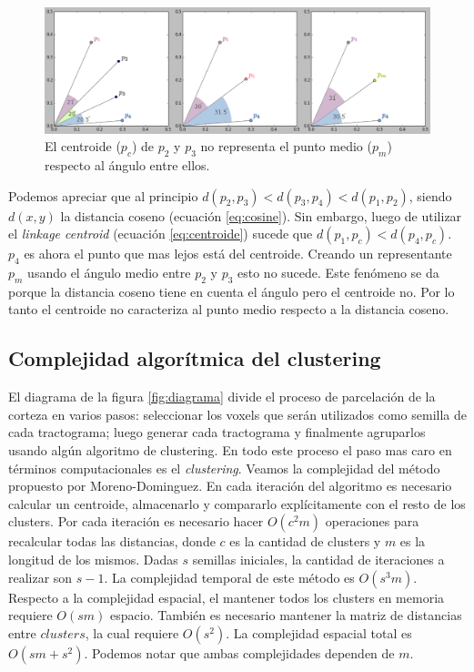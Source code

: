 \begin{figure}[h!] 
    \centering
    \includegraphics[width=\textwidth]{img/cosine_centroid.png}
    \caption{El centroide ($p_c$) de $p_2$ y $p_3$ no representa el punto
             medio ($p_m$) respecto al \'angulo entre ellos.}
    \label{fig:cos_cen}
\end{figure} 

Podemos apreciar que al principio $d(p_2,p_3) < d(p_3,p_4) < d(p_1,p_2)$,
siendo $d(x,y)$ la distancia coseno (ecuaci\'on \ref{eq:cosine}). Sin
embargo, luego de utilizar el \textit{linkage centroid} 
(ecuaci\'on \ref{eq:centroide}) sucede que $d(p_1,p_c) < d(p_4,p_c)$. $p_4$
es ahora el punto que mas lejos est\'a del centroide. Creando un
representante $p_m$ usando el \'angulo medio entre $p_2$ y $p_3$ esto no
sucede. Este fen\'omeno se da porque la distancia coseno tiene en cuenta
el \'angulo pero el centroide no. Por lo tanto el centroide no caracteriza
al punto medio respecto a la distancia coseno. \\


\subsection{Complejidad algor\'itmica del clustering}
\label{sec:complejidad_moreno}

El diagrama de la figura \ref{fig:diagrama} divide el proceso de 
parcelaci\'on de la corteza en varios pasos: seleccionar los voxels que 
ser\'an utilizados como semilla de cada tractograma; luego generar cada
tractograma y finalmente agruparlos usando alg\'un algoritmo de clustering.
En todo este proceso el paso mas caro en t\'erminos computacionales es el
\textit{clustering}. Veamos la  complejidad del m\'etodo propuesto por
Moreno-Dominguez. En cada iteraci\'on del algoritmo es necesario calcular
un centroide, almacenarlo y compararlo expl\'icitamente con el resto de
los clusters. Por cada iteraci\'on es necesario hacer 
$O(c^2 m)$ operaciones para recalcular todas las distancias, donde $c$ es
la cantidad de clusters y $m$ es la longitud de los mismos. Dadas $s$
semillas iniciales, la cantidad de iteraciones a realizar son $s-1$. La
complejidad temporal de este m\'etodo es $O(s^3 m)$. Respecto a la 
complejidad espacial, el mantener todos los clusters en memoria requiere
$O(s m)$ espacio. Tambi\'en es necesario mantener la matriz de distancias
entre $clusters$, la cual requiere $O(s^2)$. La complejidad espacial total
es $O(s m + s^2)$. Podemos notar que ambas complejidades dependen de $m$.
\\ 

